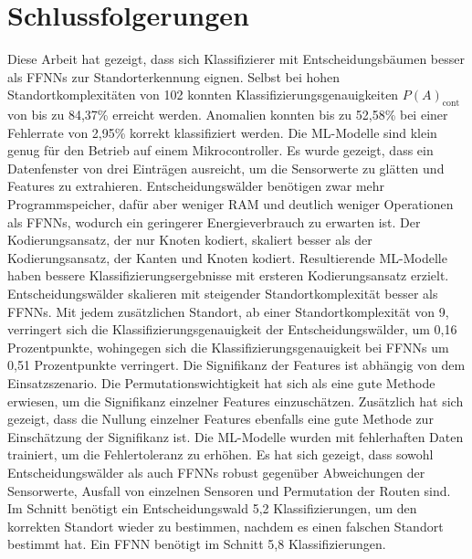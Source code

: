 \chapter{Schlussfolgerungen}
Diese Arbeit hat gezeigt, dass sich Klassifizierer mit Entscheidungsbäumen besser als FFNNs zur Standorterkennung eignen.
Selbst bei hohen Standortkomplexitäten von 102 konnten Klassifizierungsgenauigkeiten $P(A)_{\text{cont}}$ von bis zu 84,37\% erreicht werden.
Anomalien konnten bis zu 52,58\% bei einer Fehlerrate von 2,95\% korrekt klassifiziert werden.
\newline
\newline
Die ML-Modelle sind klein genug für den Betrieb auf einem Mikrocontroller.
Es wurde gezeigt, dass ein Datenfenster von drei Einträgen ausreicht, um die Sensorwerte zu glätten und Features zu extrahieren.
Entscheidungswälder benötigen zwar mehr Programmspeicher, dafür aber weniger RAM und deutlich weniger Operationen als FFNNs, wodurch
ein geringerer Energieverbrauch zu erwarten ist.
\newline
\newline
Der Kodierungsansatz, der nur Knoten kodiert, skaliert besser als der Kodierungsansatz, der Kanten und Knoten kodiert.
Resultierende ML-Modelle haben bessere Klassifizierungsergebnisse mit ersteren Kodierungsansatz erzielt.
Entscheidungswälder skalieren mit steigender Standortkomplexität besser als FFNNs.
Mit jedem zusätzlichen Standort, ab einer Standortkomplexität von 9, verringert sich die Klassifizierungsgenauigkeit der Entscheidungswälder,
um 0,16 Prozentpunkte, wohingegen sich die Klassifizierungsgenauigkeit bei FFNNs um 0,51 Prozentpunkte verringert.
\newline
\newline
Die Signifikanz der Features ist abhängig von dem Einsatzszenario.
Die Permutationswichtigkeit hat sich als eine gute Methode erwiesen, um die Signifikanz einzelner Features einzuschätzen.
Zusätzlich hat sich gezeigt, dass die Nullung einzelner Features ebenfalls eine gute Methode zur Einschätzung der Signifikanz ist.
\newpage
Die ML-Modelle wurden mit fehlerhaften Daten trainiert, um die Fehlertoleranz zu erhöhen.
Es hat sich gezeigt, dass sowohl Entscheidungswälder als auch FFNNs robust gegenüber Abweichungen der Sensorwerte,
Ausfall von einzelnen Sensoren und Permutation der Routen sind.
Im Schnitt benötigt ein Entscheidungswald 5,2 Klassifizierungen, um den korrekten Standort wieder zu bestimmen,
nachdem es einen falschen Standort bestimmt hat.
Ein FFNN benötigt im Schnitt 5,8 Klassifizierungen.
